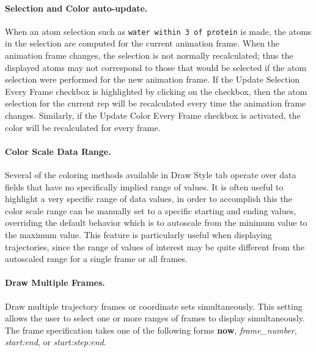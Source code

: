 \paragraph{Selection and Color auto-update.} 
When an atom selection such as {\tt water within 3 of protein} is made, the
atoms in the selection are computed for the current animation frame.  When the
animation frame changes, the selection is not normally recalculated; thus the
displayed atoms may not correspond to those that would be selected if the atom
selection were performed for the new animation frame.  If the {\sf Update
Selection Every Frame} checkbox is highlighted by clicking on the checkbox,
then the atom selection for the current rep will be recalculated every time the
animation frame changes.  Similarly, if the {\sf Update Color Every Frame}
checkbox is activated, the color will be recalculated for every frame. 

\paragraph{Color Scale Data Range.}
Several of the coloring methods available in {\sf Draw Style} tab
operate over data fields that have no specifically implied range of 
values.  It is often useful to highlight a very specific range of data
values, in order to accomplish this the color scale range can be manually
set to a specific starting and ending values, overriding the default 
behavior which is to autoscale from the minimum value to the maximum value.
This feature is particularly useful when displaying trajectories, since
the range of values of interest may be quite different from the autoscaled 
range for a single frame or all frames. 

\paragraph{Draw Multiple Frames.}
Draw multiple trajectory frames or coordinate sets simultaneously.
This setting allows the user to select one or more ranges of frames
to display simultaneously.  The frame specification takes one of the
following forms {\bf now}, {\it frame\_number}, {\it start:end}, or
{\it start:step:end}.  

